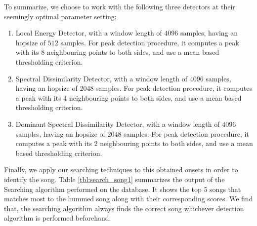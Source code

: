 \documentclass[10pt]{article}
\begin{document}
To summarize, we choose to work with the following three detectors at their seemingly optimal parameter setting;

\begin{enumerate}
    \item Local Energy Detector, with a window length of $4096$ samples, having an hopsize of $512$ samples. For peak detection procedure, it computes a peak with its 8 neighbouring points to both sides, and use a mean based thresholding criterion.
     \item Spectral Dissimilarity Detector, with a window length of $4096$ samples, having an hopsize of $2048$ samples. For peak detection procedure, it computes a peak with its 4 neighbouring points to both sides, and use a mean based thresholding criterion.
    \item Dominant Spectral Dissimilarity Detector, with a window length of $4096$ samples, having an hopsize of $2048$ samples. For peak detection procedure, it computes a peak with its 2 neighbouring points to both sides, and use a mean based thresholding criterion.
\end{enumerate}

Finally, we apply our searching techniques to this obtained onsets in order to identify the song. Table \ref{tbl:search_song1} summarizes the output of the Searching algorithm performed on the database. It shows the top 5 songs that matches most to the hummed song along with their corresponding scores. We find that, the searching algorithm always finds the correct song whichever detection algorithm is performed beforehand.
\end{document}
